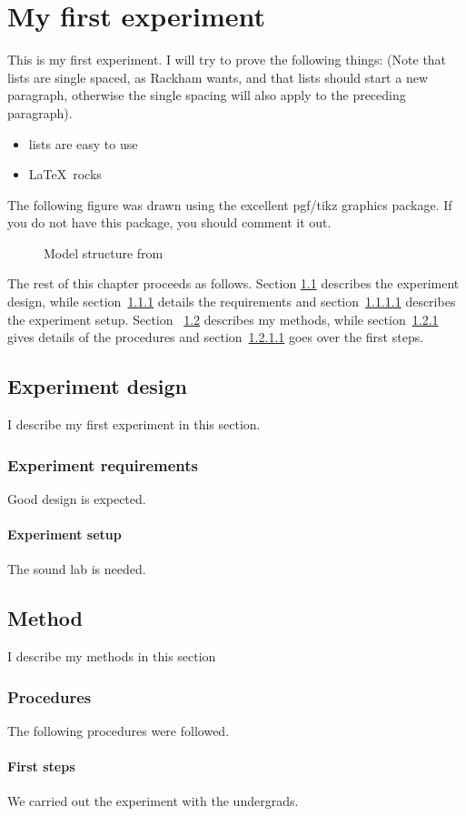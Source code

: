 \chapter{My first experiment}
\label{ch:firstExp}

This is my first experiment. I will try to prove the following things:
(Note that lists are single spaced, as Rackham wants, and that lists should
start a new paragraph, otherwise the single spacing will also apply to the
preceding paragraph).

\begin{itemize}
  \item lists are easy to use
  \item \LaTeX\ rocks
\end{itemize}

The following figure was drawn using the excellent pgf/tikz graphics package.
If you do not have this package, you should comment it out.

\begin{figure*}[htbp]
\centering

\caption[Model structure from \cite{Rumelhart1986}]{Model structure from
\cite{Rumelhart1986}}
\label{F:PDP}
\end{figure*}
The rest of this chapter proceeds as follows. Section \ref{sec:design}
describes the experiment design, while section~\ref{subsec:req} details the
requirements and section~\ref{subsubsec:setup} describes the experiment setup.
Section ~\ref{sec:method} describes my methods, while
section~\ref{subsec:procedures} gives details of the procedures and
section~\ref{subsubsec:firstSteps} goes over the first steps.

\section{Experiment design}
\label{sec:design}
I describe my first experiment in this section. 
\subsection{Experiment requirements}
\label{subsec:req}
Good design is expected.
\subsubsection{Experiment setup}
\label{subsubsec:setup}
The sound lab is needed.
\section{Method}
\label{sec:method}
I describe my methods in this section
\subsection{Procedures}
\label{subsec:procedures}
The following procedures were followed.
\subsubsection{First steps}
\label{subsubsec:firstSteps}
We carried out the experiment with the undergrads.

